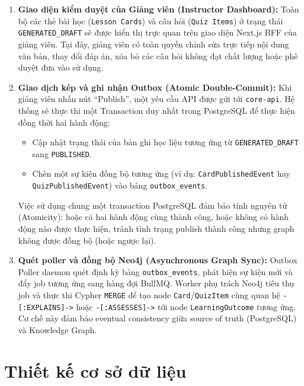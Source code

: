 \begin{enumerate}
    \item \textbf{Giao diện kiểm duyệt của Giảng viên (Instructor
          Dashboard):} Toàn bộ các thẻ bài học (\texttt{Lesson Cards}) và
          câu hỏi (\texttt{Quiz Items}) ở trạng thái
          \texttt{GENERATED\_DRAFT} sẽ được hiển thị trực quan trên giao
          diện Next.js BFF của giảng viên. Tại đây, giảng viên có toàn
          quyền chỉnh sửa trực tiếp nội dung văn bản, thay đổi đáp án, xóa
          bỏ các câu hỏi không đạt chất lượng hoặc phê duyệt đưa vào sử
          dụng.
    \item \textbf{Giao dịch kép và ghi nhận Outbox (Atomic Double-Commit):}
          Khi giảng viên nhấn nút ``Publish'', một yêu cầu API được gửi tới
          \texttt{core-api}. Hệ thống sẽ thực thi một Transaction duy nhất
          trong PostgreSQL để thực hiện đồng thời hai hành động:
        \begin{itemize}
            \item Cập nhật trạng thái của bản ghi học liệu tương ứng từ
                  \texttt{GENERATED\_DRAFT} sang \texttt{PUBLISHED}.
            \item Chèn một sự kiện đồng bộ tương ứng (ví dụ:
                  \texttt{CardPublishedEvent} hay
                  \texttt{QuizPublishedEvent}) vào bảng
                  \texttt{outbox\_events}.
        \end{itemize}
          Việc sử dụng chung một transaction PostgreSQL đảm bảo tính
          nguyên tử (Atomicity): hoặc cả hai hành động cùng thành công,
          hoặc không có hành động nào được thực hiện, tránh tình trạng
          publish thành công nhưng graph không được đồng bộ (hoặc ngược
          lại).
    \item \textbf{Quét poller và đồng bộ Neo4j (Asynchronous Graph Sync):}
          Outbox Poller daemon quét định kỳ bảng \texttt{outbox\_events},
          phát hiện sự kiện mới và đẩy job tương ứng sang hàng đợi BullMQ.
          Worker phụ trách Neo4j tiêu thụ job và thực thi Cypher
          \texttt{MERGE} để tạo node \texttt{Card}/\texttt{QuizItem} cùng
          quan hệ \texttt{-[:EXPLAINS]->} hoặc \texttt{-[:ASSESSES]->}
          tới node \texttt{LearningOutcome} tương ứng. Cơ chế này đảm bảo
          eventual consistency giữa source of truth (PostgreSQL) và
          Knowledge Graph.
\end{enumerate}

\section{Thiết kế cơ sở dữ liệu}

